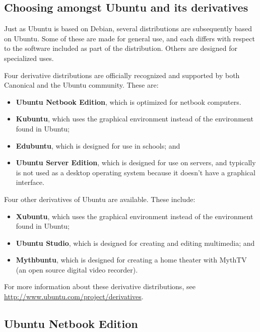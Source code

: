\subsection{Choosing amongst Ubuntu and its derivatives}

Just as Ubuntu is based on Debian, several distributions are subsequently based on Ubuntu. Some of these are made for general use, and each differs with respect to the software included as part of the distribution. Others are designed for specialized uses.

Four derivative distributions are officially recognized and supported by both Canonical and the Ubuntu community.  These are:
\begin{itemize}
    \item \textbf{Ubuntu Netbook Edition}, which is optimized for netbook computers.
    \item \textbf{Kubuntu}, which uses the  graphical environment instead of the  environment found in Ubuntu;
    \item \textbf{Edubuntu}, which is designed for use in schools; and
    \item \textbf{Ubuntu Server Edition}, which is designed for use on servers, and typically is not used as a desktop operating system because it doesn't have a graphical interface.
\end{itemize}

Four other derivatives of Ubuntu are available. These include:
\begin{itemize}
    \item \textbf{Xubuntu}, which uses the  graphical environment instead of the  environment found in Ubuntu;
    \item \textbf{Ubuntu Studio}, which is designed for creating and editing multimedia; and
    \item \textbf{Mythbuntu}, which is designed for creating a home theater  with MythTV (an open source digital video recorder).
\end{itemize}

For more information about these derivative distributions, see \url {http://www.ubuntu.com/project/derivatives}.

\subsection{Ubuntu Netbook Edition}
\label{sec:netbook-edition}

